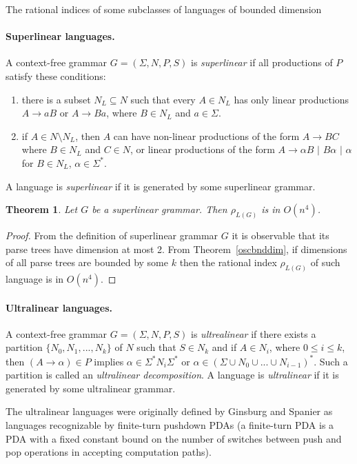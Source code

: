 \documentclass[11pt,a4paper]{article} %
\newtheorem{theorem}{Theorem}
\begin{document}
\begin{subsection}{The rational indices of some subclasses of languages of bounded dimension}  

\paragraph{Superlinear languages.} 
A context-free grammar $G = (\Sigma, N, P, S)$ is \textit{superlinear} \cite{superlinear} if all productions of $P$ satisfy these conditions:
\begin{enumerate}
\item there is a subset $N_L \subseteq N$ such that every $A \in N_L$ has only linear productions $A\rightarrow aB$ or $A\rightarrow Ba$, where $B \in N_L$ and $a \in \Sigma$.
\item if $A \in N \setminus N_L$, then $A$ can have non-linear productions of the form $A \rightarrow BC$ where $B\in N_L$ and $C \in N$, or linear productions of the form $A\rightarrow \alpha B$ $\vert$ $B \alpha$ $\vert$ $\alpha$ for $B \in N_L$, $\alpha \in \Sigma^*$.
\end{enumerate}
A language is \textit{superlinear} if it is generated by some superlinear grammar. 
\begin{theorem} Let $G$ be a superlinear grammar. Then $\rho_{L(G)}$ is in $O(n^4)$.
\end{theorem}
\begin{proof}
From the definition of superlinear grammar $G$ it is observable that its parse trees have dimension at most 2. From 
Theorem~\ref{oscbnddim}, if dimensions of all parse trees are bounded by some $k$ then the rational index $\rho_{L(G)}$ of such language is in $O(n^4)$.
\end{proof}
\end{subsection}
\paragraph{Ultralinear languages.} A context-free grammar $G = (\Sigma, N, P, S)$ is \textit{ultrealinear} if there exists a partition $\{N_0, N_1, ..., N_k\}$ of $N$ such that $S \in N_k$ and if $A \in N_i$, where $0 \le i \le k$, then $(A \rightarrow \alpha) \in P$ implies $\alpha \in \Sigma^*N_i\Sigma^*$ or $\alpha \in {(\Sigma \cup N_0 \cup ... \cup N_{i-1})}^*$. Such a partition is called an \textit{ultralinear decomposition}. A language is \textit{ultralinear} if it is generated by some ultralinear grammar. 


The ultralinear languages were originally defined by Ginsburg and Spanier \cite{Ginsburg1966FiniteTurnPA} as languages recognizable by finite-turn pushdown PDAs (a finite-turn PDA is a PDA with a fixed constant bound on the number of switches between push and pop operations in accepting computation paths). 
\end{document}

